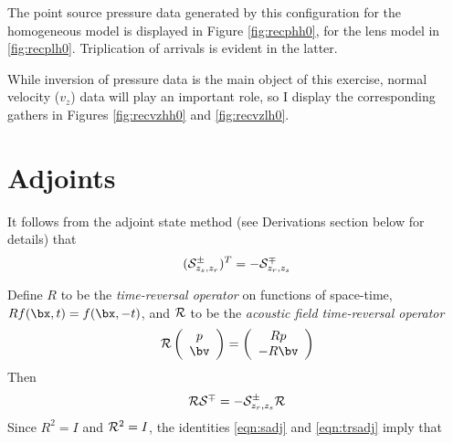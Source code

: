 
The point source pressure data generated by this configuration for the
homogeneous model is displayed in Figure \ref{fig:recphh0}, for the
lens model in \ref{fig:recplh0}. Triplication of arrivals is evident in the latter.



While inversion of pressure data is the main object of this exercise,
normal velocity ($v_z$) data will play an important role, so I display
the corresponding gathers in Figures \ref{fig:recvzhh0} and \ref{fig:recvzlh0}.



\section{Adjoints}

It follows from the adjoint state method (see Derivations section
below for details) that
\begin{equation}
  \label{eqn:sadj1}
  ({\cal S}^{\pm}_{z_s, z_r})^T = -{\cal S}^{\mp}_{z_r,z_s}
\end{equation}

Define $R$ to be the {\em time-reversal operator} on functions of
space-time, $Rf(\bx,t) = f(\bx,-t)$, and ${\cal R}$ to be the {\em
  acoustic field time-reversal operator}
\begin{equation}
  \label{eqn:trdef}
  {\cal R} \left(
    \begin{array}{c}
      p\\
      \bv
    \end{array}
  \right) =
  \left(
    \begin{array}{c}
      Rp\\
      -R\bv
    \end{array}
  \right)
\end{equation}
Then 
\begin{equation}
  \label{eqn:trsadj}
  {\cal R}{\cal S}^{\mp} = -{\cal S}^{\pm}_{z_r,z_s}{\cal R}
\end{equation}
Since $R^2 = I$ and ${\cal R}^2 = I$, the identities \ref{eqn:sadj} and \ref{eqn:trsadj} imply that

